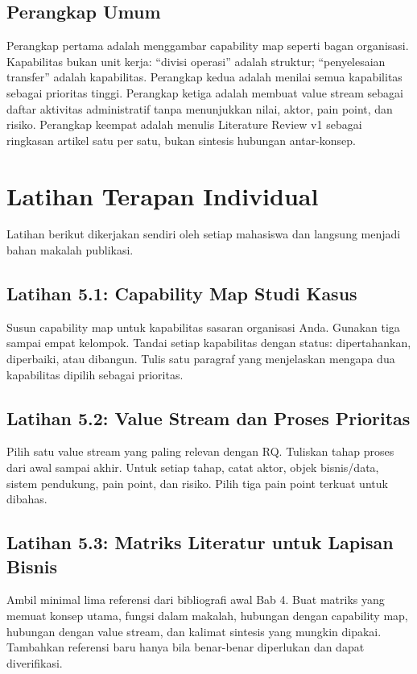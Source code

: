 \subsection{Perangkap Umum}

Perangkap pertama adalah menggambar capability map seperti bagan organisasi.
Kapabilitas bukan unit kerja: ``divisi operasi'' adalah struktur; ``penyelesaian
transfer'' adalah kapabilitas. Perangkap kedua adalah menilai semua kapabilitas
sebagai prioritas tinggi. Perangkap ketiga adalah membuat value stream sebagai
daftar aktivitas administratif tanpa menunjukkan nilai, aktor, pain point, dan
risiko. Perangkap keempat adalah menulis Literature Review v1 sebagai ringkasan
artikel satu per satu, bukan sintesis hubungan antar-konsep.

\section{Latihan Terapan Individual}

Latihan berikut dikerjakan sendiri oleh setiap mahasiswa dan langsung menjadi
bahan makalah publikasi.

\subsection*{Latihan 5.1: Capability Map Studi Kasus}

Susun capability map untuk kapabilitas sasaran organisasi Anda. Gunakan tiga
sampai empat kelompok. Tandai setiap kapabilitas dengan status: dipertahankan,
diperbaiki, atau dibangun. Tulis satu paragraf yang menjelaskan mengapa dua
kapabilitas dipilih sebagai prioritas.

\subsection*{Latihan 5.2: Value Stream dan Proses Prioritas}

Pilih satu value stream yang paling relevan dengan RQ. Tuliskan tahap proses
dari awal sampai akhir. Untuk setiap tahap, catat aktor, objek bisnis/data,
sistem pendukung, pain point, dan risiko. Pilih tiga pain point terkuat untuk
dibahas.

\subsection*{Latihan 5.3: Matriks Literatur untuk Lapisan Bisnis}

Ambil minimal lima referensi dari bibliografi awal Bab 4. Buat matriks yang
memuat konsep utama, fungsi dalam makalah, hubungan dengan capability map,
hubungan dengan value stream, dan kalimat sintesis yang mungkin dipakai.
Tambahkan referensi baru hanya bila benar-benar diperlukan dan dapat
diverifikasi.

